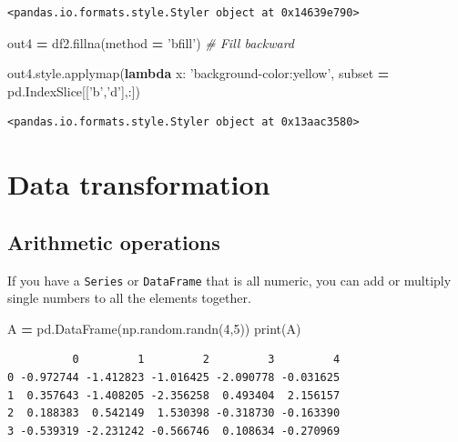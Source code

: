 \documentclass[
  letterpaper,
]{scrbook}
\newenvironment{Shaded}{\begin{snugshade}}{\end{snugshade}}
\newcommand{\BuiltInTok}[1]{#1}
\newcommand{\CommentTok}[1]{\textcolor[rgb]{0.56,0.35,0.01}{\textit{#1}}}
\newcommand{\DecValTok}[1]{\textcolor[rgb]{0.00,0.00,0.81}{#1}}
\newcommand{\KeywordTok}[1]{\textcolor[rgb]{0.13,0.29,0.53}{\textbf{#1}}}
\newcommand{\NormalTok}[1]{#1}
\newcommand{\OperatorTok}[1]{\textcolor[rgb]{0.81,0.36,0.00}{\textbf{#1}}}
\newcommand{\StringTok}[1]{\textcolor[rgb]{0.31,0.60,0.02}{#1}}
\begin{document}
\begin{verbatim}
<pandas.io.formats.style.Styler object at 0x14639e790>
\end{verbatim}

\begin{Shaded}
\begin{Highlighting}[]
\NormalTok{out4 }\OperatorTok{=}\NormalTok{ df2.fillna(method }\OperatorTok{=} \StringTok{'bfill'}\NormalTok{) }\CommentTok{# Fill backward}

\NormalTok{out4.style.applymap(}\KeywordTok{lambda}\NormalTok{ x: }\StringTok{'background-color:yellow'}\NormalTok{, subset }\OperatorTok{=}\NormalTok{ pd.IndexSlice[[}\StringTok{'b'}\NormalTok{,}\StringTok{'d'}\NormalTok{],:])}
\end{Highlighting}
\end{Shaded}

\begin{verbatim}
<pandas.io.formats.style.Styler object at 0x13aac3580>
\end{verbatim}

\hypertarget{data-transformation}{%
\section{Data transformation}\label{data-transformation}}

\hypertarget{arithmetic-operations}{%
\subsection{Arithmetic operations}\label{arithmetic-operations}}

If you have a \texttt{Series} or \texttt{DataFrame} that is all numeric, you can add or multiply single numbers to all the elements together.

\begin{Shaded}
\begin{Highlighting}[]
\NormalTok{A }\OperatorTok{=}\NormalTok{ pd.DataFrame(np.random.randn(}\DecValTok{4}\NormalTok{,}\DecValTok{5}\NormalTok{))}
\BuiltInTok{print}\NormalTok{(A)}
\end{Highlighting}
\end{Shaded}

\begin{verbatim}
          0         1         2         3         4
0 -0.972744 -1.412823 -1.016425 -2.090778 -0.031625
1  0.357643 -1.408205 -2.356258  0.493404  2.156157
2  0.188383  0.542149  1.530398 -0.318730 -0.163390
3 -0.539319 -2.231242 -0.566746  0.108634 -0.270969
\end{verbatim}
\end{document}
